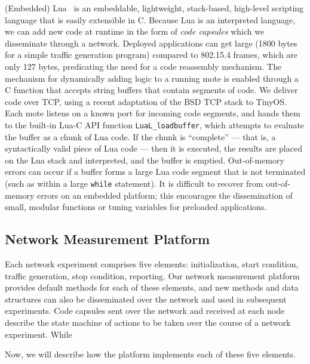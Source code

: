 (Embedded) Lua~\cite{elua} is an embeddable, lightweight, stack-based, high-level scripting language that is easily extensible in C.
Because Lua is an interpreted language, we can add new code at runtime in the form of \emph{code capsules} which we disseminate through a network.
Deployed applications can get large (1800 bytes for a simple traffic generation program) compared to 802.15.4 frames, which are only 127 bytes, predicating the need for a code reassembly mechanism.
The mechanism for dynamically adding logic to a running mote is enabled through a C function that accepts string buffers that contain segments of code.
We deliver code over TCP, using a recent adaptation of the BSD TCP stack to TinyOS.
Each mote listens on a known port for incoming code segments, and hands them to the built-in Lua-C API function \texttt{LuaL\_loadbuffer}, which attempts to evaluate the buffer as a chunk of Lua code.
If the chunk is ``complete'' --- that is, a syntactically valid piece of Lua code --- then it is executed, the results are placed on the Lua stack and interpreted, and the buffer is emptied.
Out-of-memory errors can occur if a buffer forms a large Lua code segment that is not terminated (such as within a large \texttt{while} statement).
It is difficult to recover from out-of-memory errors on an embedded platform; this encourages the dissemination of small, modular functions or tuning variables for preloaded applications.


\subsection{Network Measurement Platform}

Each network experiment comprises five elements: initialization, start condition, traffic generation, stop condition, reporting.
Our network measurement platform provides default methods for each of these elements, and new methods and data structures can also be disseminated over the network and used in subsequent experiments.
Code capsules sent over the network and received at each node describe the state machine of actions to be taken over the course of a network experiment.
While


Now, we will describe how the platform implements each of these five elements.

